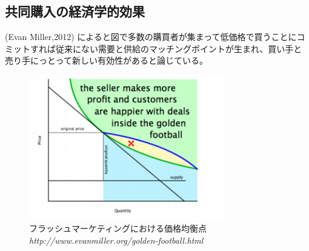 \subsection{共同購入の経済学的効果}
(Evan Miller,2012) によると図で多数の購買者が集まって低価格で買うことにコミットすれば従来にない需要と供給のマッチングポイントが生まれ、買い手と売り手にっとって新しい有効性があると論じている。
\begin{figure}[htbp]
	\centering
	\includegraphics[width=85mm, bb=0 0 200 272]{figures/nush.jpg}
	\caption{フラッシュマーケティングにおける価格均衡点 {\itshape http://www.evanmiller.org/golden-football.html}}
	\label{フラッシュマーケティングにおける価格均衡点}
\end{figure}
